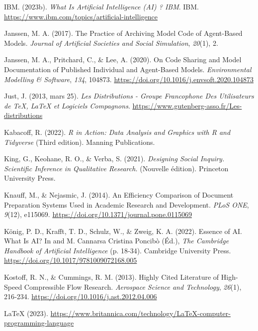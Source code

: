\documentclass[
  letterpaper,
  DIV=11,
  numbers=noendperiod]{scrreprt}
\newlength{\cslhangindent}
\newenvironment{CSLReferences}[2] %
 {\begin{list}{}{%
  \setlength{\itemindent}{0pt}
  \setlength{\leftmargin}{0pt}
  \setlength{\parsep}{0pt}
  \ifodd #1
   \setlength{\leftmargin}{\cslhangindent}
   \setlength{\itemindent}{-1\cslhangindent}
  \fi
  \setlength{\itemsep}{#2\baselineskip}}}
 {\end{list}}
\begin{document}
\begin{CSLReferences}{1}{0}
IBM. (2023b). \emph{What Is {Artificial Intelligence} ({AI}) ?
\textbar{} {IBM}}. IBM.
\url{https://www.ibm.com/topics/artificial-intelligence}

Janssen, M. A. (2017). The {Practice} of {Archiving Model Code} of
{Agent-Based Models}. \emph{Journal of Artificial Societies and Social
Simulation}, \emph{20}(1), 2.

Janssen, M. A., Pritchard, C., \& Lee, A. (2020). On Code Sharing and
Model Documentation of Published Individual and Agent-Based Models.
\emph{Environmental Modelling \& Software}, \emph{134}, 104873.
\url{https://doi.org/10.1016/j.envsoft.2020.104873}

Just, J. (2013, mars 25). \emph{Les Distributions - {Groupe} Francophone
Des {Utilisateurs} de {TeX}, {LaTeX} et Logiciels Compagnons}.
\url{https://www.gutenberg-asso.fr/Les-distributions}

Kabacoff, R. (2022). \emph{R in Action: Data Analysis and Graphics with
{R} and {Tidyverse}} (Third edition). Manning Publications.

King, G., Keohane, R. O., \& Verba, S. (2021). \emph{Designing {Social
Inquiry}. {Scientific Inference} in {Qualitative Research}.} (Nouvelle
édition). Princeton University Press.

Knauff, M., \& Nejasmic, J. (2014). An {Efficiency Comparison} of
{Document Preparation Systems Used} in {Academic Research} and
{Development}. \emph{PLoS ONE}, \emph{9}(12), e115069.
\url{https://doi.org/10.1371/journal.pone.0115069}

König, P. D., Krafft, T. D., Schulz, W., \& Zweig, K. A. (2022). Essence
of {AI}. {What Is AI}? In and M. Cannarsa Cristina Poncibò (Éd.),
\emph{The {Cambridge Handbook} of {Artificial Intelligence}} (p. 18‑34).
Cambridge University Press.
\url{https://doi.org/10.1017/9781009072168.005}

Kostoff, R. N., \& Cummings, R. M. (2013). Highly Cited Literature of
High-Speed Compressible Flow Research. \emph{Aerospace Science and
Technology}, \emph{26}(1), 216‑234.
\url{https://doi.org/10.1016/j.ast.2012.04.006}

{LaTeX} (2023).
\url{https://www.britannica.com/technology/LaTeX-computer-programming-language}


\end{CSLReferences}
\end{document}
